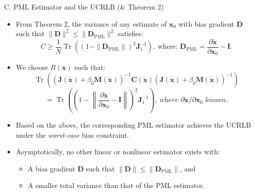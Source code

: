 \documentclass{beamer}
\begin{document}
\begin{frame}{C. PML Estimator and the UCRLB (\& Theorem 2)}
\begin{itemize}
    \item From Theorem 2, the variance of any estimate of \(\mathbf{x}_0\) with bias gradient \(\mathbf{D}\) such that \(\|\mathbf{D}\|^2 \leq \|\mathbf{D}_{\text{PML}}\|^2\) satisfies:
    \[C \geq \frac{1}{N} \operatorname{Tr} \left( (1 - \|\mathbf{D}_{\text{PML}}\|)^2 \mathbf{J}_1^{-1} \right), \  \text{where: } \mathbf{D}_{\text{PML}} = \frac{\partial \check{\mathbf{x}}}{\partial \mathbf{x}_0} - \mathbf{I}.\]

    \item We choose $R(\mathbf{x})$ such that:
    \[\operatorname{Tr} \left( (\mathbf{J}(\check{\mathbf{x}}) + \beta_0 \mathbf{M}(\check{\mathbf{x}}))^{-1} \mathbf{C}(\check{\mathbf{x}}) (\mathbf{J}(\check{\mathbf{x}}) + \beta_0 \mathbf{M}(\check{\mathbf{x}}))^{-1} \right)\]
    \[= \operatorname{Tr} \left( \left( 1 - \left\| \frac{\partial \check{\mathbf{x}}}{\partial \mathbf{x}_0} - \mathbf{I} \right\| \right)^2 \mathbf{J}_1^{-1} \right), \ \scriptstyle \textit{where \(\partial \check{\mathbf{x}} / \partial \mathbf{x}_0\) known}.\]
     
    \item Based on the above, the corresponding PML estimator achieves the UCRLB under the \textit{worst-case} bias constraint.
    \item Asymptotically, no other linear or nonlinear estimator exists with:
    \begin{itemize}
        \item A bias gradient $\mathbf{D}$ such that $\|\mathbf{D}\| \leq \|\mathbf{D}_{\text{PML}}\|$, and
        \item A smaller total variance than that of the PML estimator.
    \end{itemize}
\end{itemize}
\end{frame}
\end{document}

